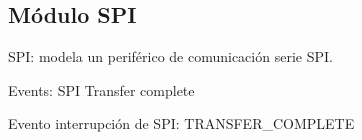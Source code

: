 \subsection{Módulo SPI}

SPI: modela un periférico de comunicación serie SPI.


Events:
SPI Transfer complete

Evento interrupción de SPI: TRANSFER\_COMPLETE



